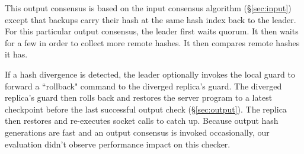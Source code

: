 This output consensus is based on the input consensus algorithm 
(\S\ref{sec:input}) except that backups carry their hash at the same hash index 
back to the leader. For this particular output consensus, the leader first 
waits quorum. It then waits for a few \us in order to collect more remote 
hashes. It then compares remote hashes it has.

If a hash divergence is detected, the leader optionally invokes the local guard 
to forward a ``rollback" command to the diverged replica's guard. The diverged 
replica's guard then rolls back and restores the server program to a latest 
checkpoint before the last successful output check (\S\ref{sec:output}). The 
replica then restores and re-executes socket calls to catch up. Because output 
hash generations are fast and an output consensus is invoked occasionally, our 
evaluation didn't observe performance impact on this checker.





